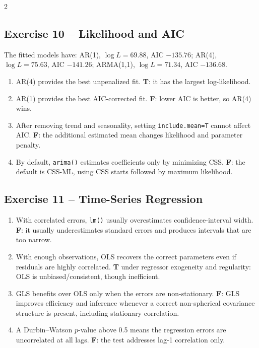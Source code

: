 \documentclass[9pt,a4paper]{extarticle}
\begin{document}
\begin{multicols}{2}
\subsection*{Exercise 10 -- Likelihood and AIC}
The fitted models have: AR(1), \(\log L=69.88\), AIC \(-135.76\); AR(4), \(\log L=75.63\), AIC \(-141.26\); ARMA(1,1), \(\log L=71.34\), AIC \(-136.68\).
\begin{enumerate}[label=\alph*),leftmargin=4mm]
\item AR(4) provides the best unpenalized fit. \textbf{T}: it has the largest log-likelihood.
\item AR(1) provides the best AIC-corrected fit. \textbf{F}: lower AIC is better, so AR(4) wins.
\item After removing trend and seasonality, setting \texttt{include.mean=T} cannot affect AIC. \textbf{F}: the additional estimated mean changes likelihood and parameter penalty.
\item By default, \texttt{arima()} estimates coefficients only by minimizing CSS. \textbf{F}: the default is CSS-ML, using CSS starts followed by maximum likelihood.
\end{enumerate}

\subsection*{Exercise 11 -- Time-Series Regression}
\begin{enumerate}[label=\alph*),leftmargin=4mm]
\item With correlated errors, \texttt{lm()} usually overestimates confidence-interval width. \textbf{F}: it usually underestimates standard errors and produces intervals that are too narrow.
\item With enough observations, OLS recovers the correct parameters even if residuals are highly correlated. \textbf{T} under regressor exogeneity and regularity: OLS is unbiased/consistent, though inefficient.
\item GLS benefits over OLS only when the errors are non-stationary. \textbf{F}: GLS improves efficiency and inference whenever a correct non-spherical covariance structure is present, including stationary correlation.
\item A Durbin--Watson \(p\)-value above 0.5 means the regression errors are uncorrelated at all lags. \textbf{F}: the test addresses lag-1 correlation only.
\end{enumerate}


\end{multicols}
\end{document}
